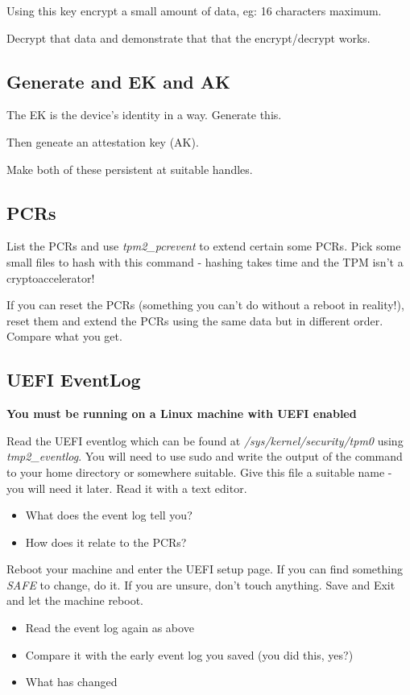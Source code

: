 \documentclass[11pt,a4paper]{article}
\begin{document}
Using this key encrypt a small amount of data, eg: 16 characters maximum.

Decrypt that data and demonstrate that that the encrypt/decrypt works.

\subsection{Generate and EK and AK}
The EK is the device's identity in a way. Generate this.

Then geneate an attestation key (AK).

Make both of these persistent at suitable handles.

\subsection{PCRs}\label{pcrs}
List the PCRs and use \textit{tpm2\_pcrevent} to extend certain some PCRs.  Pick some small files to hash with this command - hashing takes time and the TPM isn't a cryptoaccelerator!

If you can reset the PCRs (something you can't do without a reboot in reality!), reset them and extend the PCRs using the same data but in different order. Compare what you get.


\subsection{UEFI EventLog}
\textbf{You must be running on a Linux machine with UEFI enabled}

Read the UEFI eventlog which can be found at \textit{/sys/kernel/security/tpm0} using \textit{tmp2\_eventlog}. You will need to use sudo and write the output of the command to your home directory or somewhere suitable. Give this file a suitable name - you will need it later. Read it with a text editor.

\begin{itemize}
 \item What does the event log tell you?  
 \item How does it relate to the PCRs?
\end{itemize}

Reboot your machine and enter the UEFI setup page. If you can find something \textit{SAFE} to change, do it. If you are unsure, don't touch anything. Save and Exit and let the machine reboot.

\begin{itemize}
 \item Read the event log again as above
 \item Compare it with the early event log you saved (you did this, yes?)
 \item What has changed
\end{itemize}
\end{document}

